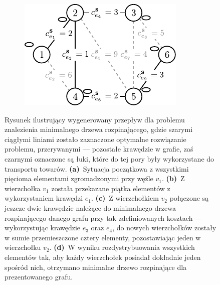 \begin{figure}[!htbp]
\begin{subfigure}[b]{0.242\textwidth}
		\caption{}
		\label{fig:mst2Example:c}
	\end{subfigure}
	\hfill
	\begin{subfigure}[b]{0.242\textwidth}
		\includegraphics[width=\textwidth]{Chapter_III/MST2-example/d}
		\caption{}
		\label{fig:mst2Example:d}
	\end{subfigure}
	\hfill\null
	\caption{
		Rysunek ilustrujący wygenerowany przepływ dla problemu znalezienia minimalnego drzewa rozpinającego, gdzie szarymi ciągłymi liniami zostało zaznaczone optymalne rozwiązanie problemu, przerywanymi --- pozostałe krawędzie w grafie, zaś czarnymi oznaczone są łuki, które do tej pory były wykorzystane do transportu towarów.
		\textbf{(a)}~Sytuacja początkowa z wszystkimi pięcioma elementami zgromadzonymi przy węźle $v_{1}$.
		\textbf{(b)}~Z wierzchołka $v_{1}$ została przekazane piątka elementów z wykorzystaniem krawędzi $e_{1}$.
		\textbf{(c)}~Z wierzchołkiem $v_{2}$ połączone są jeszcze dwie krawędzie należące do minimalnego drzewa rozpinającego danego grafu przy tak zdefiniowanych kosztach --- wykorzystując krawędzie $e_{3}$ oraz $e_{4}$, do nowych wierzchołków zostały w sumie przemieszczone cztery elementy, pozostawiając jeden w wierzchołku $v_{2}$.
		\textbf{(d)}~W wyniku rozdystrybuowania wszystkich elementów tak, aby każdy wierzchołek posiadał dokładnie jeden spośród nich, otrzymano minimalne drzewo rozpinające dla prezentowanego grafu. 
	}
	\label{fig:mst2Example}
\end{figure}

